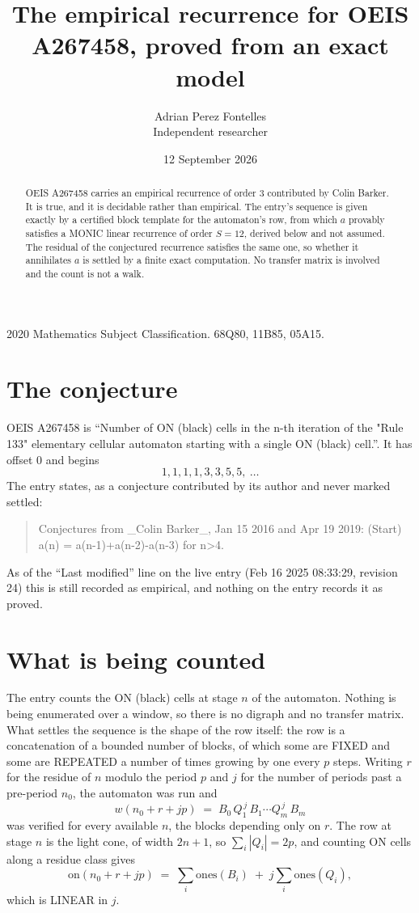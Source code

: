 \documentclass[11pt,a4paper]{article}
\title{The empirical recurrence for OEIS A267458, proved from an exact model}
\author{Adrian Perez Fontelles\\ \small Independent researcher}
\date{12 September 2026}
\theoremstyle{plain}
\theoremstyle{definition}
\begin{document}
\maketitle

\begin{abstract}
OEIS A267458 carries an empirical recurrence of order $3$ contributed by Colin Barker. It is true, and it is
decidable rather than empirical. The entry's sequence is given exactly by a certified block template for the automaton's row, from
which $a$ provably satisfies a MONIC linear recurrence of order $S=12$, derived below and not
assumed. The residual of the conjectured recurrence satisfies the same one, so whether it
annihilates $a$ is settled by a finite exact computation. No transfer matrix is involved and
the count is not a walk.
\end{abstract}

\noindent\small 2020 Mathematics Subject Classification. 68Q80, 11B85, 05A15.\normalsize

\section{The conjecture}

OEIS A267458 is ``Number of ON (black) cells in the n-th iteration of the "Rule 133" elementary cellular automaton starting with a single ON (black) cell.''. It has offset $0$ and begins
\[
1, 1, 1, 1, 3, 3, 5, 5,\ \dots
\]
The entry states, as a conjecture contributed by its author and never marked settled:
\begin{quote}
Conjectures from \_Colin Barker\_, Jan 15 2016 and Apr 19 2019: (Start) a(n) = a(n-1)+a(n-2)-a(n-3) for n>4.
\end{quote}
As of the ``Last modified'' line on the live entry (Feb 16 2025 08:33:29, revision 24)
this is still recorded as empirical, and nothing on the entry records it as proved.

\section{What is being counted}

The entry counts the ON (black) cells at stage $n$ of the automaton. Nothing is being enumerated over a window, so there is
no digraph and no transfer matrix. What settles the sequence is the shape of the row itself:
the row is a concatenation of a bounded number of blocks, of which some are
FIXED and some are REPEATED a number of times growing by one every $p$ steps. Writing $r$ for
the residue of $n$ modulo the period $p$ and $j$ for the number of periods past a pre-period
$n_0$, the automaton was run and
\[
w(n_0 + r + jp)\;=\;B_0\,Q_1^{\,j}\,B_1\cdots Q_m^{\,j}\,B_m
\]
was verified for every available $n$, the blocks depending only on $r$. The
row at stage $n$ is the light cone, of width $2n+1$, so $\sum_i|Q_i|=2p$, and counting ON
cells along a residue class gives
\[
\mathrm{on}(n_0+r+jp)\;=\;\sum_i \mathrm{ones}(B_i)\;+\;j\sum_i \mathrm{ones}(Q_i),
\]
which is LINEAR in $j$.
\end{document}
